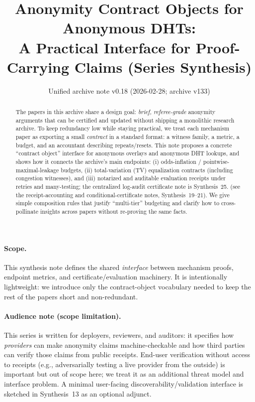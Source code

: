 \documentclass[11pt]{article}
\title{Anonymity Contract Objects for Anonymous DHTs:\\A Practical Interface for Proof-Carrying Claims (Series Synthesis)}
\author{}
\date{Unified archive note v0.18 (2026-02-28; archive v133)}
\begin{document}
\maketitle

\begin{abstract}
The papers in this archive share a design goal: \emph{brief, referee-grade} anonymity arguments that can be
certified and updated without shipping a monolithic research archive.
To keep redundancy low while staying practical, we treat each mechanism paper as exporting a small \emph{contract}
in a standard format: a witness family, a metric, a budget, and an accountant describing repeats/resets.
This note proposes a concrete ``contract object'' interface for anonymous overlays and anonymous DHT lookups, and
shows how it connects the archive's main endpoints: (i) odds-inflation / pointwise-maximal-leakage budgets,
(ii) total-variation (TV) equalization contracts (including congestion witnesses), and (iii) notarized and auditable
evaluation receipts under retries and many-testing; the centralized log-audit certificate note is Synthesis~25.\cite{series:stataudit} (see the receipt-accounting and conditional-certificate notes, Synthesis~19--21).\cite{series:accountingrulebook,series:auditorreplay,series:condcert}
We give simple composition rules that justify ``multi-tier'' budgeting and clarify how to cross-pollinate insights
across papers without re-proving the same facts.
\end{abstract}
\paragraph{Scope.}
This synthesis note defines the shared \emph{interface} between mechanism proofs, endpoint metrics, and certificate/evaluation machinery.
It is intentionally lightweight: we introduce only the contract-object vocabulary needed to keep the rest of the papers short and non-redundant.

\paragraph{Audience note (scope limitation).} This series is written for deployers, reviewers, and auditors: it specifies how \emph{providers} can make anonymity claims machine-checkable and how third parties can verify those claims from public receipts. End-user verification without access to receipts (e.g., adversarially testing a live provider from the outside) is important but out of scope here; we treat it as an additional threat model and interface problem. A minimal user-facing discoverability/validation interface is sketched in Synthesis~13 as an optional adjunct.\cite{series:userverif}
\end{document}
